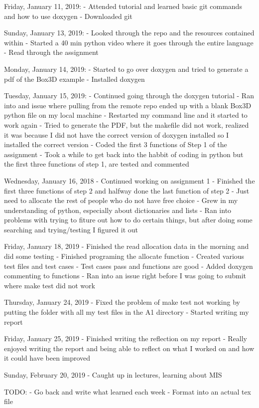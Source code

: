 Friday, January 11, 2019:
	- Attended tutorial and learned basic git commands and how to use doxygen
	- Downloaded git

Sunday, January 13, 2019:
	- Looked through the repo and the resources contained within
	- Started a 40 min python video where it goes through the entire language
	- Read through the assignment 

Monday, January 14, 2019:
	- Started to go over doxygen and tried to generate a pdf of the Box3D example
	- Installed doxygen

Tuesday, January 15, 2019:
	- Continued going through the doxygen tutorial
	- Ran into and issue where pulling from the remote repo ended up with a blank Box3D python file on my local machine
	- Restarted my command line and it started to work again
	- Tried to generate the PDF, but the makefile did not work, realized it was because I did not have the correct version of doxygen installed so I installed the correct version
	- Coded the first 3 functions of Step 1 of the assignment
	- Took a while to get back into the habbit of coding in python but the first three functions of step 1, are tested and commented

Wednesday, January 16, 2018
	- Continued working on assignment 1
	- Finished the first three functions of step 2 and halfway done the last function of step 2
	- Just need to allocate the rest of people who do not have free choice
	- Grew in my understanding of python, especially about dictionaries and lists
	- Ran into problems with trying to fiture out how to do certain things, but after doing some searching and trying/testing I figured it out

Friday, January 18, 2019
	- Finished the read allocation data in the morning and did some testing
	- Finished programing the allocate function
	- Created various test files and test cases
	- Test cases pass and functions are good
	- Added doxygen commenting to functions
	- Ran into an issue right before I was going to submit where make test did not work

Thursday, January 24, 2019
	- Fixed the problem of make test not working by putting the folder with all my test files in the A1 directory
	- Started writing my report

Friday, January 25, 2019
	- Finished writing the reflection on my report
	- Really enjoyed writing the report and being able to reflect on what I worked on and how it could have been improved

Sunday, February 20, 2019
	- Caught up in lectures, learning about MIS	

TODO:
- Go back and write what learned each week
- Format into an actual tex file
